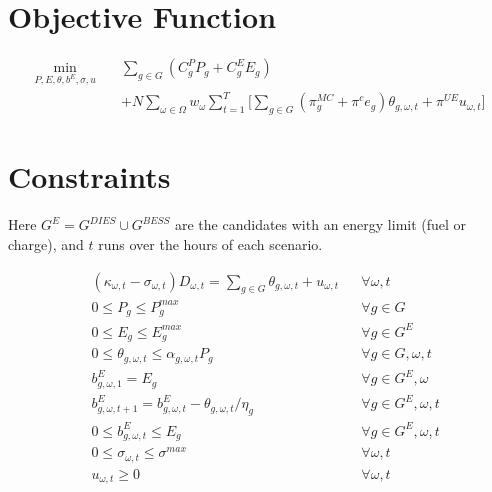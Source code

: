 \documentclass{article}
\begin{document}
\section{Objective Function}

\begin{equation}
\begin{split}
\min_{P, E, \theta, b^{E}, \sigma, u} \quad
& \sum_{g \in G} \left( C^{P}_{g} P_g + C^{E}_{g} E_g \right) \\
& + N \sum_{\omega \in \Omega} w_\omega \sum_{t=1}^{T} \Big[ \sum_{g \in G} \left( \pi^{MC}_g + \pi^{c} e_g \right) \theta_{g,\omega,t} + \pi^{UE} u_{\omega,t} \Big]
\end{split}
\end{equation}

\section{Constraints}

\noindent Here $G^{E} = G^{DIES} \cup G^{BESS}$ are the candidates with an energy limit (fuel or charge), and $t$ runs over the hours of each scenario.

\begin{align}
& (\kappa_{\omega,t} - \sigma_{\omega,t}) D_{\omega,t} = \sum_{g \in G} \theta_{g,\omega,t} + u_{\omega,t} && \forall \omega, t \\
& 0 \le P_g \le P^{max}_g && \forall g \in G \\
& 0 \le E_g \le E^{max}_g && \forall g \in G^{E} \\
& 0 \le \theta_{g,\omega,t} \le \alpha_{g,\omega,t} P_g && \forall g \in G, \omega, t \\
& b^{E}_{g,\omega,1} = E_g && \forall g \in G^{E}, \omega \\
& b^{E}_{g,\omega,t+1} = b^{E}_{g,\omega,t} - \theta_{g,\omega,t} / \eta_g && \forall g \in G^{E}, \omega, t \\
& 0 \le b^{E}_{g,\omega,t} \le E_g && \forall g \in G^{E}, \omega, t \\
& 0 \le \sigma_{\omega,t} \le \sigma^{max} && \forall \omega, t \\
& u_{\omega,t} \ge 0 && \forall \omega, t
\end{align}
\end{document}
